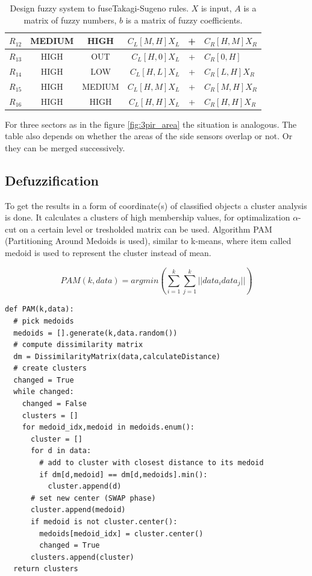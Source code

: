 \begin{table}[h!]
\begin{center}
\begin{tabular}{|c|c c|rcl|}
$R_{12}$        & MEDIUM          & HIGH            & $C_{L}[M,H]X_L $&+&$ C_{R}[H,M]X_R$   \\ \hline
$R_{13}$        & HIGH            & OUT             & $C_{L}[H,0]X_L $&+&$ C_{R}[0,H]   $   \\ \hline
$R_{14}$        & HIGH            & LOW             & $C_{L}[H,L]X_L $&+&$ C_{R}[L,H]X_R$   \\ \hline
$R_{15}$        & HIGH            & MEDIUM          & $C_{L}[H,M]X_L $&+&$ C_{R}[M,H]X_R$   \\ \hline
$R_{16}$        & HIGH            & HIGH            & $C_{L}[H,H]X_L $&+&$ C_{R}[H,H]X_R$   \\ \hline
\end{tabular}
\caption{Design fuzzy system to fuseTakagi-Sugeno rules. $X$ is input, $A$ is a matrix of fuzzy numbers, $b$ is a matrix of fuzzy coefficients.\label{table:fuzzyfusion} \cite{InsightIntoFuzzyModelling}}
\end{center}
\end{table}

For three sectors as in the figure \ref{fig:3pir_area} the situation is analogous. The table also depends
on whether the areas of the side sensors overlap or not. Or they can be merged successively.

\subsection*{Defuzzification}

To get the results in a form of coordinate(s) of classified objects a cluster analysis is done. It calculates
a clusters of high membership values, for optimalization $\alpha$-cut on a certain level or tresholded
matrix can be used. Algorithm PAM (Partitioning Around Medoids is used), similar to k-means, where item called
medoid is used to represent the cluster instead of mean.

$$ \mathit{PAM}(k, data) = argmin \left( \sum_{i=1}^{k} \sum_{j=1}^{k} ||data_{i} data_{j}||  \right) $$

\begin{lstlisting}[style=python]
def PAM(k,data):
  # pick medoids
  medoids = [].generate(k,data.random())
  # compute dissimilarity matrix
  dm = DissimilarityMatrix(data,calculateDistance)
  # create clusters
  changed = True
  while changed:
    changed = False
    clusters = []
    for medoid_idx,medoid in medoids.enum():
      cluster = []
      for d in data:
        # add to cluster with closest distance to its medoid
        if dm[d,medoid] == dm[d,medoids].min():
          cluster.append(d)
      # set new center (SWAP phase)
      cluster.append(medoid)
      if medoid is not cluster.center():
        medoids[medoid_idx] = cluster.center()
        changed = True
      clusters.append(cluster)
  return clusters
\end{lstlisting}

